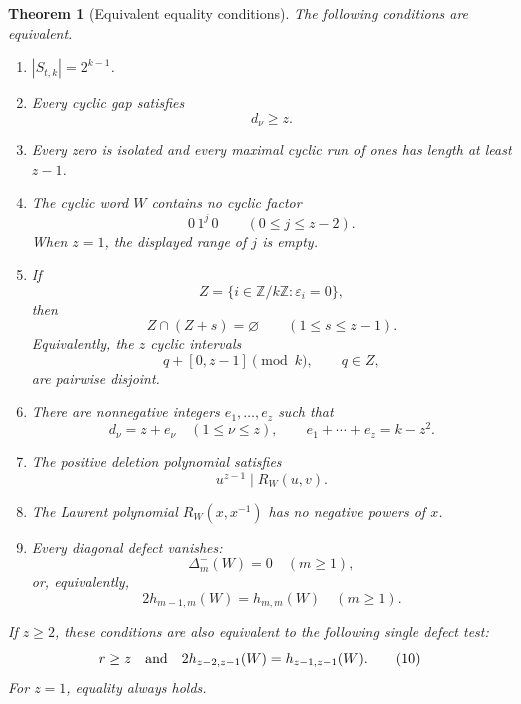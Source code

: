 \documentclass[10pt,a4paper]{article}
\newtheorem{theorem}{Theorem}[section]
\begin{document}
\begin{theorem}[Equivalent equality conditions]\label{thm:main}
The following conditions are equivalent.

\begin{enumerate}[label=\textup{(\roman*)},ref=\textup{(\roman*)},leftmargin=3em]
\item \label{it:equality}
      $|S_{t,k}|=2^{k-1}$.

\item \label{it:gaps}
      Every cyclic gap satisfies
      \[
                              d_\nu\geq z.
      \]

\item \label{it:runs}
      Every zero is isolated and every maximal cyclic run of ones has
      length at least $z-1$.

\item \label{it:patterns}
      The cyclic word $W$ contains no cyclic factor
      \[
                              0\,1^j\,0
                              \qquad(0\leq j\leq z-2).
      \]
      When $z=1$, the displayed range of $j$ is empty.

\item \label{it:packing}
      If
      \[
            Z=\{i\in\mathbb Z/k\mathbb Z:\varepsilon_i=0\},
      \]
      then
      \[
             Z\cap(Z+s)=\varnothing
             \qquad(1\leq s\leq z-1).                       \tag{6}
      \]
      Equivalently, the $z$ cyclic intervals
      \[
             q+[0,z-1]\pmod k,\qquad q\in Z,
      \]
      are pairwise disjoint.

\item \label{it:composition}
      There are nonnegative integers $e_1,\ldots,e_z$ such that
      \[
             d_\nu=z+e_\nu\quad(1\leq\nu\leq z),
             \qquad
             e_1+\cdots+e_z=k-z^2.                           \tag{7}
      \]

\item \label{it:divisibility}
      The positive deletion polynomial satisfies
      \[
                              u^{z-1}\mid R_W(u,v).           \tag{8}
      \]

\item \label{it:negative}
      The Laurent polynomial $R_W(x,x^{-1})$ has no negative
      powers of $x$.

\item \label{it:defects}
      Every diagonal defect vanishes:
      \[
            \Delta_m^-(W)=0\quad(m\geq1),
      \]
 or, equivalently,
      \[
            2h_{m-1,m}(W)=h_{m,m}(W)\quad(m\geq1).           \tag{9}
      \]
\end{enumerate}

If $z\geq2$, these conditions are also equivalent to the following
single defect test:
\begin{equation}
 r\geq z
 \quad\hbox{and}\quad
 2h_{z-2,z-1}(W)=h_{z-1,z-1}(W).                             \tag{10}
\end{equation}
For $z=1$, equality always holds.
\end{theorem}
\end{document}

